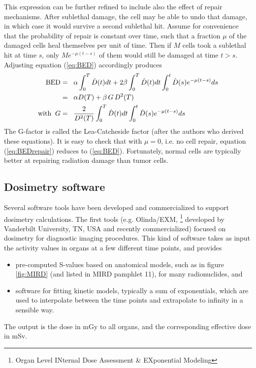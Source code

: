 \documentclass[11pt,oneside]{article}
\begin{document}
This expression can be further refined to include also the effect of
repair mechanisms. After sublethal damage, the cell may be able to
undo that damage, in which case it would survive a second sublethal
hit. Assume for convenience that the probability of repair is constant
over time, such that a fraction $\mu$ of the damaged cells heal
themselves per unit of time. Then if $M$ cells took a sublethal hit at
time $s$, only $M e^{-\mu (t - s)}$ of them would still be damaged at
time $t > s$. Adjusting equation (\ref{eq:BED}) accordingly produces
\begin{align}
  \mbox{BED} &=\;\; \alpha \int_0^T \dot D(t) dt
  + 2 \beta \int_0^T \dot D(t) dt
  \int_0^t \dot D(s) e^{-\mu(t-s)}ds \nonumber\\
  &=\;\; \alpha D(T) + \beta \, G \, D^2(T) \label{eq:BEDrepair}\\
  \mbox{with\;\;} G &=\;\; \frac{2}{D^2(T)} \int_0^T \dot D(t) dt
    \int_0^t \dot D(s) e^{-\mu(t-s)}ds \nonumber
\end{align}
The G-factor is called the Lea-Catcheside factor (after the authors
who derived these equations). It is easy to check that with $\mu =
0$, i.e. no cell repair, equation (\ref{eq:BEDrepair}) reduces to
(\ref{eq:BED}). Fortunately, normal cells are typically better at
repairing radiation damage than tumor cells.

\subsection{Dosimetry software}
Several software tools have been developed and commercialized to
support dosimetry calculations. The first tools (e.g. Olinda/EXM,
\footnote{Organ Level INternal Dose Assessment \& EXponential
  Modeling} developed by Vanderbilt University, TN, USA and recently
commercialized) focused on dosimetry for diagnostic imaging
procedures. This kind of software takes as input the activity values
in organs at a few different time points, and provides
\begin{itemize}
  \item pre-computed S-values based on anatomical models, such as in
    figure \ref{fig:MIRD} (and listed in MIRD pamphlet 11), for many
    radionuclides, and
  \item software for fitting kinetic models, typically a sum of
    exponentials, which are used to interpolate between the time
    points and extrapolate to infinity in a sensible way.
\end{itemize}
The output is the dose in mGy to all organs, and the corresponding
effective dose in mSv.
\end{document}

